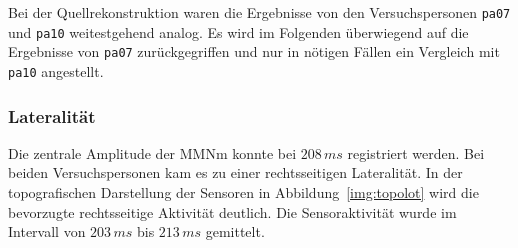 \documentclass[doc,a4paper,12pt]{apa6}
\begin{document}
Bei der Quellrekonstruktion waren die Ergebnisse von den Versuchspersonen \texttt{pa07} und \texttt{pa10} weitestgehend analog. Es wird im Folgenden überwiegend auf die Ergebnisse von \texttt{pa07} zurückgegriffen und nur in nötigen Fällen ein Vergleich mit \texttt{pa10} angestellt.

\subsubsection{Lateralität}

Die zentrale Amplitude der MMNm konnte bei $208\,ms$ registriert werden. Bei beiden Versuchspersonen kam es zu einer rechtsseitigen Lateralität. In der topografischen Darstellung der Sensoren in Abbildung~\ref{img:topolot} wird die bevorzugte rechtsseitige Aktivität deutlich. Die Sensoraktivität wurde im Intervall von  $203\,ms$ bis $213\,ms$ gemittelt.
\end{document}
